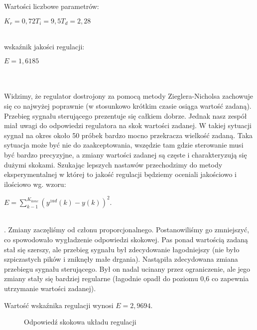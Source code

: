 Wartości liczbowe parametrów:
\begin{center}
$K_{r}=0,72 T_{i}=9,5 T_{d}=2,28$
\end{center}
~\\wskaźnik jakości regulacji:
\begin{center}
$E=1,6185$
\end{center}
~\\\\Widzimy, że regulator dostrojony za pomocą metody Zieglera-Nicholsa zachowuje się co najwyżej poprawnie (w stosunkowo krótkim czasie osiąga wartość zadaną). Przebieg sygnału sterującego prezentuje się całkiem dobrze. Jednak nasz zespół miał uwagi do odpowiedzi regulatora na skok wartości zadanej. W takiej sytuacji sygnał na okres około 50 próbek bardzo mocno przekracza wielkość zadaną. Taka sytuacja może być nie do zaakceptowania, wszędzie tam gdzie sterowanie musi być bardzo precyzyjne, a zmiany wartości zadanej są częste i charakteryzują się dużymi skokami. Szukając lepszych nastawów przechodzimy do metody eksperymentalnej w której to jakość regulacji będziemy oceniali jakościowo i ilościowo wg. wzoru:
\begin{center}
$E=\sum_{k-1}^{K_{konc}}(y^{zad}(k)-y(k))^{2}$.
\end{center}

~\\
. Zmiany zaczęliśmy od członu proporcjonalnego. Postanowiliśmy go zmniejszyć, co spowodowało wygładzenie odpowiedzi skokowej. Pas ponad wartością zadaną stał się szerszy, ale przebieg sygnału był zdecydowanie łagodniejszy (nie było szpiczastych pików i zniknęły małe drgania). Nastąpiła zdecydowana zmiana przebiegu sygnału sterującego. Był on nadal ucinany przez ograniczenie, ale jego zmiany stały się bardziej regularne (łagodnie opadł do poziomu 0,6 co zapewnia utrzymanie wartości zadanej).

\begin{center}
Wartość wskaźnika regulacji wynosi $E=2,9694$.
\end{center}
\begin{figure}[h]
    \centering
    \caption{Odpowiedź skokowa układu regulacji}
    \label{zad5_niegasnące_oscylacje}
\end{figure}

